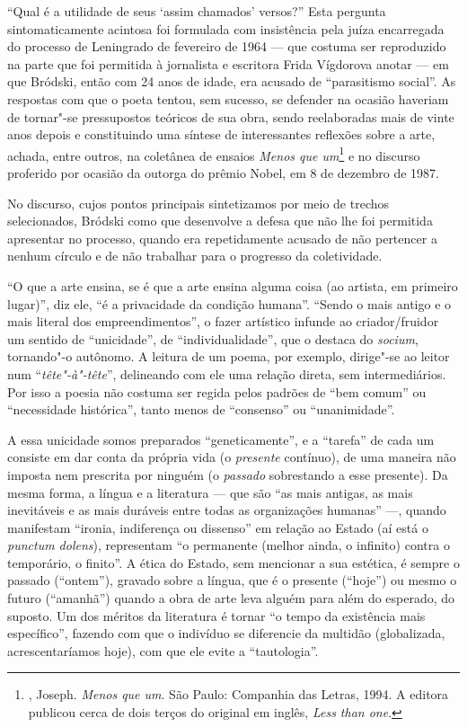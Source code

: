 ``Qual é a utilidade de seus `assim chamados' versos?'' Esta pergunta sintomaticamente acintosa foi formulada com insistência pela
juíza encarregada do processo de Leningrado de fevereiro de 1964 ---
que costuma ser reproduzido na parte que foi permitida à jornalista e escritora Frida Vígdorova
anotar --- em que Bródski, então com 24 anos de idade,
era acusado de ``parasitismo social''. As respostas com que o poeta
tentou, sem sucesso, se defender na ocasião haveriam de tornar"-se
pressupostos teóricos de sua obra, sendo reelaboradas mais de vinte anos
depois e constituindo uma síntese de interessantes reflexões
sobre a arte, achada, entre outros, na coletânea de ensaios \emph{Menos que um}\footnote{, Joseph. \emph{Menos que um}. São Paulo: Companhia das Letras, 1994. A editora publicou cerca de dois terços do original em inglês, \emph{Less than one}.} e no discurso proferido por ocasião da outorga do prêmio Nobel, em 8 de dezembro de 1987.

No discurso, cujos pontos principais sintetizamos por meio de trechos selecionados, Bródski como que
desenvolve a defesa que não lhe foi permitida apresentar no processo,
quando era repetidamente acusado de não pertencer a nenhum círculo e de
não trabalhar para o progresso da coletividade.

``O que a arte ensina, se é que a arte ensina alguma coisa (ao
artista, em primeiro lugar)'', diz ele, ``é a privacidade da
condição humana''. ``Sendo o mais antigo e o mais literal dos
empreendimentos'', o fazer artístico infunde ao criador/fruidor um sentido de
``unicidade'', de ``individualidade'', que o destaca do \emph{socium}, tornando"-o
autônomo. A leitura de um poema, por exemplo, dirige"-se ao leitor num
``\emph{tête"-à"-tête}'', delineando com ele uma relação direta, sem
intermediários. Por isso a poesia não costuma ser regida pelos padrões
de ``bem comum'' ou ``necessidade histórica'', tanto menos de
``consenso'' ou ``unanimidade''.

A essa unicidade somos preparados ``geneticamente'', e a ``tarefa'' de cada um
consiste em dar conta da própria vida (o \emph{presente} contínuo), de
uma maneira não imposta nem prescrita por ninguém (o \emph{passado}
sobrestando a esse presente). Da mesma forma, a língua e
a literatura --- que são ``as mais antigas, as mais
inevitáveis e as mais duráveis entre todas as organizações humanas'' ---,
quando manifestam ``ironia, indiferença ou dissenso'' em relação ao Estado
(aí está o \emph{punctum dolens}), representam ``o permanente (melhor ainda, o infinito) contra o temporário, o finito''. A ética do
Estado, sem mencionar a sua estética, é sempre o passado (``ontem''), gravado
sobre a língua, que é o presente (``hoje'') ou mesmo o futuro (``amanhã'') quando a obra de arte
leva alguém para além do esperado, do
suposto. Um dos méritos da literatura é tornar ``o tempo da existência
mais específico'', fazendo com que o indivíduo se diferencie da multidão
(globalizada, acrescentaríamos hoje), com que ele evite a ``tautologia''.

